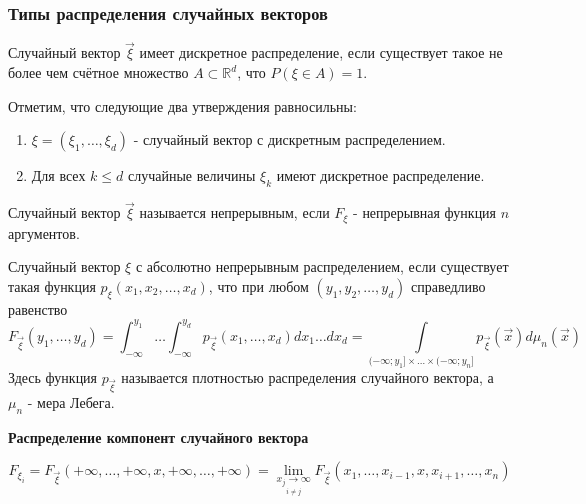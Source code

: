 \subsubsection{Типы распределения случайных векторов}

\begin{definition}
	Случайный вектор $\vec{\xi}$ имеет дискретное распределение, если существует такое не более чем счётное множество $A \subset \mathbb{R}^d$, что $P(\xi \in A) = 1$.
	
	Отметим, что следующие два утверждения равносильны:
	\begin{enumerate}
		\item $\xi = (\xi_1, \dots, \xi_d)$ - случайный вектор с дискретным распределением.
		\item Для всех $k \le d$ случайные величины $\xi_k$ имеют дискретное распределение.
	\end{enumerate}
\end{definition}

\begin{definition}
	Случайный вектор $\vec{\xi}$ называется непрерывным, если $F_{\xi}$ - непрерывная функция $n$ аргументов.
\end{definition}

\begin{definition}
	Случайный вектор $\xi$ с абсолютно непрерывным распределением, если существует такая функция $p_{\xi} (x_1, x_2, \dots, x_d)$, что при любом $(y_1, y_2, \dots, y_d)$ справедливо равенство
	\[ F_{\vec{\xi}} (y_1, \dots, y_d) = \int_{-\infty}^{y_1} \dots \int_{-\infty}^{y_d} p_{\vec{\xi}} (x_1, \dots, x_d) dx_1 \dots dx_d = \int\limits_{( - \infty; y_1 ] \times \dots \times ( - \infty; y_n ]} p_{\vec{\xi}} (\vec{x}) d \mu_n (\vec{x}) \]
	Здесь функция $p_{\vec{\xi}}$ называется плотностью распределения случайного вектора, а $\mu_n$ - мера Лебега.
\end{definition}



\begin{center}
	\textbf{Распределение компонент случайного вектора}
\end{center}
\[ F_{\xi_i} = F_{\vec{\xi}} ( + \infty, \dots, + \infty, x, + \infty, \dots, + \infty ) = \lim\limits_{\underset{i \ne j}{x_j \to \infty}} F_{\vec{\xi}} (x_1, \dots, x_{i-1}, x, x_{i+1}, \dots, x_n) \]

